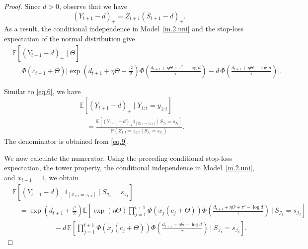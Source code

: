 \documentclass[11pt,authoryear]{elsarticle}
\def\P#1{{\mathbb{P}}\left(#1\right)}
\def\E#1{{\mathbb E}\left[#1\right]}
\theoremstyle{nopunct}
\numberwithin{equation}{section}
\begin{document}
\begin{proof}

Since \(d>0\), observe that we have
\[
(Y_{t+1}-d)_+
=
Z_{t+1}(S_{t+1}-d)_+.
\]
As a result, the conditional independence in
Model~\ref{m.2.uni} and the stop-loss expectation of the normal distribution give
\[
\begin{aligned}
&\E{
(Y_{t+1}-d)_+
\mid
\Theta
}\\
&=
\Phi(c_{t+1}+\Theta)
\Bigg[
\exp\left(
d_{t+1}
+
\eta\Theta
+
\frac{\tau^2}{2}
\right)
\Phi\left(
\frac{
d_{t+1}+\eta\Theta+\tau^2-\log d
}{\tau}
\right)-
d\,
\Phi\left(
\frac{
d_{t+1}+\eta\Theta-\log d
}{\tau}
\right)
\Bigg].
\end{aligned}
\]

Similar to \eqref{eq.6}, we have
\begin{equation}\label{eq.stop.loss.ratio.uni}
\begin{aligned}
&\E{
(Y_{t+1}-d)_+
\mid
Y_{1:t}=y_{1:t}
}\\
&\quad=
\frac{
\E{
(Y_{t+1}-d)_+
1_{\left[Z_{1:t}=z_{1:t}\right]}
\mid
S_{\mathcal I_t}=s_{\mathcal I_t}
}
}{
\P{
Z_{1:t}=z_{1:t}
\mid
S_{\mathcal I_t}=s_{\mathcal I_t}
}
}.
\end{aligned}
\end{equation}
The denominator is obtained from \eqref{eq.9}.

We now calculate the numerator. Using the preceding conditional
stop-loss expectation, the tower property, the conditional
independence in Model~\ref{m.2.uni}, and \(x_{t+1}=1\), we obtain
\begin{equation}\label{eq.stop.loss.numerator.uni}
\begin{aligned}
&\E{
(Y_{t+1}-d)_+
1_{\left[Z_{1:t}=z_{1:t}\right]}
\mid
S_{\mathcal I_t}=s_{\mathcal I_t}
}\\
&\quad=
\exp\left(
d_{t+1}
+
\frac{\tau^2}{2}
\right)
\E{
\exp(\eta\Theta)
\prod_{j=1}^{t+1}
\Phi\left(
x_j(c_j+\Theta)
\right)
\Phi\left(
\frac{
d_{t+1}+\eta\Theta+\tau^2-\log d
}{\tau}
\right)
\ \bigg|\
S_{\mathcal I_t}=s_{\mathcal I_t}
}\\
&\qquad\qquad\qquad-
d\,
\E{
\prod_{j=1}^{t+1}
\Phi\left(
x_j(c_j+\Theta)
\right)
\Phi\left(
\frac{
d_{t+1}+\eta\Theta-\log d
}{\tau}
\right)
\ \bigg|\
S_{\mathcal I_t}=s_{\mathcal I_t}
}.
\end{aligned}
\end{equation}


\end{proof}
\end{document}
